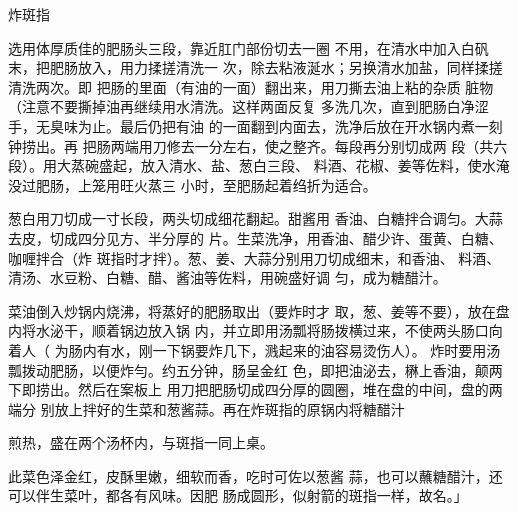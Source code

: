 \begin{recipe}{炸斑指}

\ingredients






\cooking

\step 选用体厚质佳的肥肠头三段，靠近肛门部份切去一圈 不用，在清水中加入白矾末，把肥肠放入，用力揉搓清洗一 次，除去粘液涎水；另换清水加盐，同样揉搓清洗两次。即 把肠的里面（有油的一面）翻出来，用刀撕去油上粘的杂质 脏物（注意不要撕掉油再继续用水清洗。这样两面反复 多洗几次，直到肥肠白净涩手，无臭味为止。最后仍把有油 的一面翻到内面去，洗净后放在开水锅内煮一刻钟捞出。再 把肠两端用刀修去一分左右，使之整齐。每段再分别切成两 段（共六段）。用大蒸碗盛起，放入清水、盐、葱白三段、 料酒、花椒、姜等佐料，使水淹没过肥肠，上笼用旺火蒸三 小时，至肥肠起着绉折为适合。

\step 葱白用刀切成一寸长段，两头切成细花翻起。甜酱用 香油、白糖拌合调匀。大蒜去皮，切成四分见方、半分厚的 片。生菜洗净，用香油、醋少许、蛋黄、白糖、咖喱拌合（炸 斑指时才拌）。葱、姜、大蒜分别用刀切成细末，和香油、 料酒、清汤、水豆粉、白糖、醋、酱油等佐料，用碗盛好调 匀，成为糖醋汁。

\step 菜油倒入炒锅内烧沸，将蒸好的肥肠取出（要炸时才 取，葱、姜等不要），放在盘内将水泌干，顺着锅边放入锅 内，并立即用汤瓢将肠拨横过来，不使两头肠口向着人（ 为肠内有水，刚一下锅要炸几下，溅起来的油容易烫伤人）。 炸时要用汤瓢拨动肥肠，以便炸勻。约五分钟，肠呈金红 色，即把油泌去，楙上香油，颠两下即捞出。然后在案板上 用刀把肥肠切成四分厚的圆圈，堆在盘的中间，盘的两端分 别放上拌好的生菜和葱酱蒜。再在炸斑指的原锅内将糖醋汁

煎热，盛在两个汤杯内，与斑指一同上桌。

\notes

此菜色泽金红，皮酥里嫩，细软而香，吃时可佐以葱酱 蒜，也可以蘸糖醋汁，还可以伴生菜叶，都各有风味。因肥 肠成圆形，似射箭的斑指一样，故名。」

\end{recipe}


